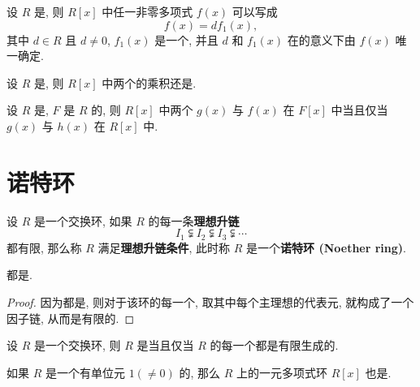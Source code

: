 \begin{lemma}
	设 $R$ 是, 则 $R[x]$ 中任一非零多项式 $f(x)$ 可以写成 $$f(x)=df_1(x),$$ 其中 $d\in R$ 且 $d\neq 0$, $f_1(x)$ 是一个, 并且 $d$ 和 $f_1(x)$ 在的意义下由 $f(x)$ 唯一确定.
\end{lemma}

\begin{lemma}[高斯引理]
	设 $R$ 是, 则 $R[x]$ 中两个的乘积还是.
\end{lemma}

\begin{lemma}
	设 $R$ 是, $F$ 是 $R$ 的, 则 $R[x]$ 中两个 $g(x)$ 与 $f(x)$ 在 $F[x]$ 中当且仅当 $g(x)$ 与 $h(x)$ 在 $R[x]$ 中.
\end{lemma}

\begin{lemma}
	
\end{lemma}


\section{诺特环}



\begin{definition}\label{理想升链}\label{理想升链条件}\label{诺特环}
	 设 $R$ 是一个交换环, 如果 $R$ 的每一条\textbf{理想升链} $$I_1\subsetneqq I_2\subsetneqq I_3\subsetneqq\cdots$$ 都有限, 那么称 $R$ 满足\textbf{理想升链条件}, 此时称 $R$ 是一个\textbf{诺特环 (Noether ring)}.
\end{definition}

\begin{corollary}
	都是.
\end{corollary}

\begin{proof}
	因为都是, 则对于该环的每一个, 取其中每个主理想的代表元, 就构成了一个因子链, 从而是有限的.
\end{proof}

\begin{theorem}
	设 $R$ 是一个交换环, 则 $R$ 是当且仅当 $R$ 的每一个都是有限生成的.
\end{theorem}

\begin{theorem}
	如果 $R$ 是一个有单位元 $1(\neq 0)$ 的, 那么 $R$ 上的一元多项式环 $R[x]$ 也是.
\end{theorem}


